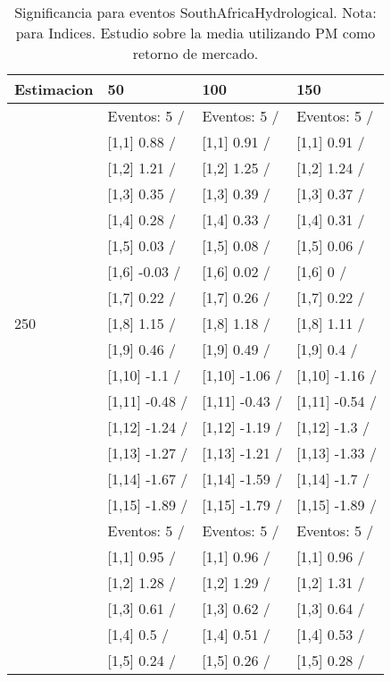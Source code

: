 \begin{table}

\caption{Significancia para eventos SouthAfricaHydrological. Nota: para Indices. Estudio sobre la media utilizando PM como retorno de mercado.}
\centering
\begin{tabular}[t]{llll}
\toprule
Estimacion & 50 & 100 & 150\\
\midrule
 & Eventos:  5 / & Eventos:  5 / & Eventos:  5 /\\
 & {}[1,1] 0.88  / & {}[1,1] 0.91  / & {}[1,1] 0.91  /\\
 & {}[1,2] 1.21  / & {}[1,2] 1.25  / & {}[1,2] 1.24  /\\
 & {}[1,3] 0.35  / & {}[1,3] 0.39  / & {}[1,3] 0.37  /\\
 & {}[1,4] 0.28  / & {}[1,4] 0.33  / & {}[1,4] 0.31  /\\
\addlinespace
 & {}[1,5] 0.03  / & {}[1,5] 0.08  / & {}[1,5] 0.06  /\\
 & {}[1,6] -0.03  / & {}[1,6] 0.02  / & {}[1,6] 0  /\\
 & {}[1,7] 0.22  / & {}[1,7] 0.26  / & {}[1,7] 0.22  /\\
250 & {}[1,8] 1.15  / & {}[1,8] 1.18  / & {}[1,8] 1.11  /\\
 & {}[1,9] 0.46  / & {}[1,9] 0.49  / & {}[1,9] 0.4  /\\
\addlinespace
 & {}[1,10] -1.1  / & {}[1,10] -1.06  / & {}[1,10] -1.16  /\\
 & {}[1,11] -0.48  / & {}[1,11] -0.43  / & {}[1,11] -0.54  /\\
 & {}[1,12] -1.24  / & {}[1,12] -1.19  / & {}[1,12] -1.3  /\\
 & {}[1,13] -1.27  / & {}[1,13] -1.21  / & {}[1,13] -1.33  /\\
 & {}[1,14] -1.67  / & {}[1,14] -1.59  / & {}[1,14] -1.7  /\\
\addlinespace
 & {}[1,15] -1.89  / & {}[1,15] -1.79  / & {}[1,15] -1.89  /\\
 & Eventos:  5 / & Eventos:  5 / & Eventos:  5 /\\
 & {}[1,1] 0.95  / & {}[1,1] 0.96  / & {}[1,1] 0.96  /\\
 & {}[1,2] 1.28  / & {}[1,2] 1.29  / & {}[1,2] 1.31  /\\
 & {}[1,3] 0.61  / & {}[1,3] 0.62  / & {}[1,3] 0.64  /\\
\addlinespace
 & {}[1,4] 0.5  / & {}[1,4] 0.51  / & {}[1,4] 0.53  /\\
 & {}[1,5] 0.24  / & {}[1,5] 0.26  / & {}[1,5] 0.28  /\\

\end{tabular}
\end{table}
